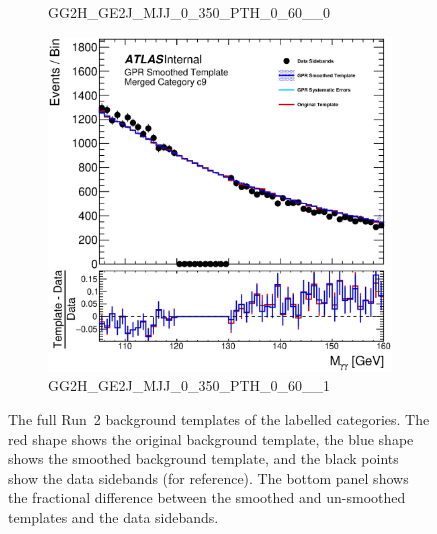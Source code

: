 \begin{figure}
\begin{center}
\begin{subfigure}[T]{0.49\linewidth}
	\caption{GG2H\_GE2J\_MJJ\_0\_350\_PTH\_0\_60\_\_0}
\end{subfigure}
\begin{subfigure}[T]{0.49\linewidth}
	\centering
	\includegraphics[width=\linewidth]{figures/background/gpr/coupCatTemplates/GPR_Smoothed_Plot_hmgg_c9.eps}
	\caption{GG2H\_GE2J\_MJJ\_0\_350\_PTH\_0\_60\_\_1}
\end{subfigure}
\caption{The full Run~2 background templates of the labelled categories. The red shape shows the original background template, the blue shape shows the smoothed background template, and the black points show the data sidebands (for reference). The bottom panel shows the fractional difference between the smoothed and un-smoothed templates and the data sidebands. }
\label{fig:gpr_coupcat_2}
\end{center}
\end{figure}

